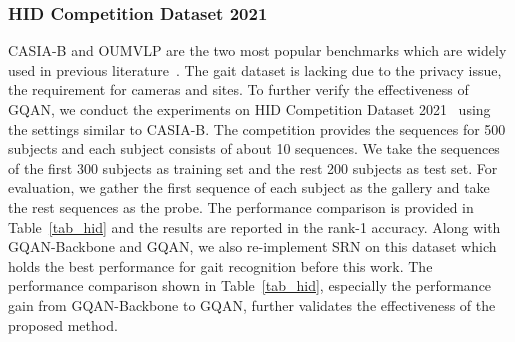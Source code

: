 \subsubsection{HID Competition Dataset 2021}
CASIA-B and OUMVLP are the two most popular benchmarks which are widely used in previous literature~\cite{chao2019gaitset,fan2020gaitpart,hou2020gait,hou2021setres}.
%
The gait dataset is lacking due to the privacy issue, the requirement for cameras and sites.
%
To further verify the effectiveness of GQAN, we conduct the experiments on HID Competition Dataset 2021~\cite{yu2021hid} using the settings similar to CASIA-B.
%
The competition provides the sequences for 500 subjects and each subject consists of about 10 sequences.
%
We take the sequences of the first 300 subjects as training set and the rest 200 subjects as test set.
%
For evaluation, we gather the first sequence of each subject as the gallery and take the rest sequences as the probe.
%
The performance comparison is provided in Table~\ref{tab_hid} and the results are reported in the rank-1 accuracy.
%
Along with GQAN-Backbone and GQAN, we also re-implement SRN on this dataset which holds the best performance for gait recognition before this work.
%
The performance comparison shown in Table~\ref{tab_hid}, especially the performance gain from GQAN-Backbone to GQAN, further validates the effectiveness of the proposed method.

\begin{table}[!tbp]
	\caption{
		The effect of each block for GQAN. The results are reported in the rank-1 accuracy excluding the identical-view cases.
	}
	\label{tab_ablation}
	\begin{center}
	\end{center}
\end{table}

